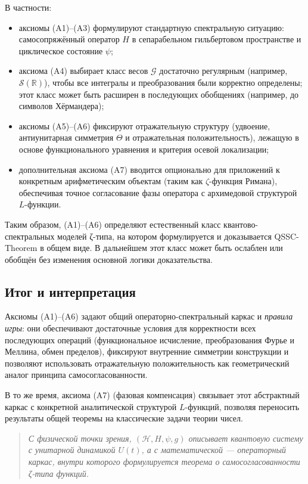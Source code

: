 \documentclass{article}
\numberwithin{equation}{section}
\theoremstyle{plain}
\theoremstyle{definition}
\theoremstyle{remark}
\begin{document}
В частности:
\begin{itemize}
  \item аксиомы (A1)–(A3) формулируют стандартную спектральную ситуацию: самосопряжённый оператор $H$ в сепарабельном гильбертовом пространстве и циклическое состояние $\psi$;
  \item аксиома (A4) выбирает класс весов $\mathcal G$ достаточно регулярным (например, $\mathcal S(\mathbb R)$), чтобы все интегралы и преобразования были корректно определены; этот класс может быть расширен в последующих обобщениях (например, до символов Хёрмандера);
  \item аксиомы (A5)–(A6) фиксируют отражательную структуру (удвоение, антиунитарная симметрия $\Theta$ и отражательная положительность), лежащую в основе функционального уравнения и критерия осевой локализации;
  \item дополнительная аксиома (A7) вводится опционально для приложений к конкретным арифметическим объектам (таким как $\zeta$-функция Римана), обеспечивая точное согласование фазы оператора с архимедовой структурой $L$-функции.
\end{itemize}
Таким образом, (A1)–(A6) определяют естественный класс квантово-спектральных моделей ζ-типа, на котором формулируется и доказывается QSSC-Theorem в общем виде. В дальнейшем этот класс может быть ослаблен или обобщён без изменения основной логики доказательства.

\subsection{Итог и интерпретация}

\noindent
Аксиомы (A1)–(A6) задают общий операторно-спектральный каркас и \emph{правила игры}:  
они обеспечивают достаточные условия для корректности всех последующих операций (функциональное исчисление, преобразования Фурье и Меллина, обмен пределов), фиксируют внутренние симметрии конструкции и позволяют использовать отражательную положительность как геометрический аналог принципа самосогласованности.

В то же время, аксиома (A7) (фазовая компенсация) связывает этот абстрактный каркас с конкретной аналитической структурой $L$-функций, позволяя переносить результаты общей теоремы на классические задачи теории чисел.

\begin{quote}
\textit{С физической точки зрения, $(\mathcal H,H,\psi,g)$ описывает квантовую систему с унитарной динамикой $U(t)$, а с математической — операторный каркас, внутри которого формулируется теорема о самосогласованности ζ-типа функций.}
\end{quote}
\end{document}
